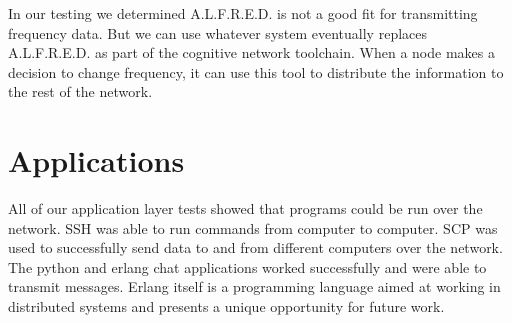 In our testing we determined A.L.F.R.E.D. is not a good fit for transmitting frequency data. But we can use whatever system eventually replaces A.L.F.R.E.D. as part of the cognitive network toolchain. When a node makes a decision to change frequency, it can use this tool to distribute the information to the rest of the network. 

\section{Applications}

All of our application layer tests showed that programs could be run over the network. SSH was able to run commands from computer to computer. SCP was used to successfully send data to and from different computers over the network. The python and erlang chat applications worked successfully and were able to transmit messages. Erlang itself is a programming language aimed at working in distributed systems and presents a unique opportunity for future work.  
